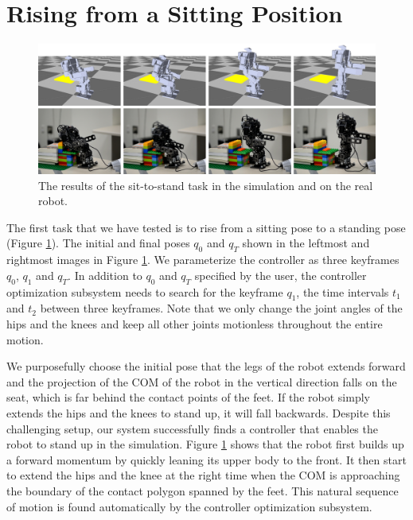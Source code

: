 \section{Rising from a Sitting Position}

\begin{figure}[!t]
  \centering
  \includegraphics[width=\textwidth]{figures/sit2Stand}
  \caption{The results of the sit-to-stand task in the simulation and on the real robot.}
  \label{fig:sit2Stand}
\end{figure}

The first task that we have tested is to rise from a sitting pose to a standing pose (Figure \ref{fig:sit2Stand}). The initial and final poses $q_0$ and $q_T$ shown in the leftmost and rightmost images in Figure \ref{fig:sit2Stand}. We parameterize the controller as three keyframes $q_0$, $q_1$ and $q_T$. In addition to $q_0$ and $q_T$ specified by the user, the controller optimization subsystem needs to search for the keyframe $q_1$, the time intervals $t_1$ and $t_2$ between three keyframes. Note that we only change the joint angles of the hips and the knees and keep all other joints motionless throughout the entire motion.

We purposefully choose the initial pose that the legs of the robot extends forward and the projection of the COM of the robot in the vertical direction falls on the seat, which is far behind the contact points of the feet. If the robot simply extends the hips and the knees to stand up, it will fall backwards. Despite this challenging setup, our system successfully finds a controller that enables the robot to stand up in the simulation. Figure \ref{fig:sit2Stand} shows that the robot first builds up a forward momentum by quickly leaning its upper body to the front. It then start to extend the hips and the knee at the right time when the COM is approaching the boundary of the contact polygon spanned by the feet. This natural sequence of motion is found automatically by the controller optimization subsystem.

